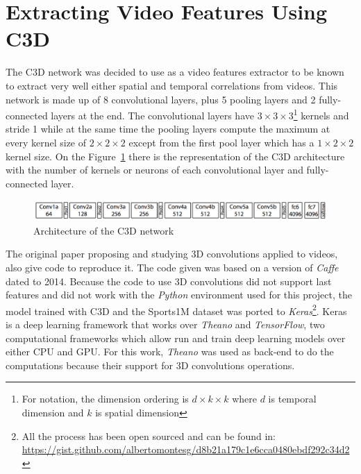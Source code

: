 \section{Extracting Video Features Using C3D}

The C3D network\cite{tran2014learning} was decided to use as a video features extractor to be known to extract very well\cite{baccouche2011sequential}\cite{tran2015deep}\cite{tran2014learning}\cite{shoutemporal} either spatial and temporal correlations from videos. This network is made up of 8 convolutional layers, plus 5 pooling layers and 2 fully-connected layers at the end. The convolutional layers have $3 \times 3 \times 3$\footnote{For notation, the dimension ordering is $d \times k \times k$ where $d$ is temporal dimension and $k$ is spatial dimension} kernels and stride 1 while at the same time the pooling layers compute the maximum at every kernel size of $2 \times 2 \times 2$ except from the first pool layer which has a $1 \times 2 \times 2$ kernel size. On the Figure~\ref{fig:c3d_architecture} there is the representation of the C3D architecture with the number of kernels or neurons of each convolutional layer and fully-connected layer.

\begin{figure}[H]
\begin{center}
\includegraphics[width=1\linewidth]{img/methodology/c3d_architecture}
\end{center}
\caption{Architecture of the C3D network}
\label{fig:c3d_architecture}
\end{figure}

The original paper proposing and studying 3D convolutions applied to videos, also give code to reproduce it. The code given was based on a version of \textit{Caffe}\cite{jia2014caffe} dated to 2014. Because the code to use 3D convolutions did not support last features and did not work with the \textit{Python} environment used for this project, the model trained with C3D and the Sports1M dataset was ported to \textit{Keras}\footnote{All the process has been open sourced and can be found in: \url{https://gist.github.com/albertomontesg/d8b21a179c1e6cca0480ebdf292c34d2}}. Keras is a deep learning framework that works over \textit{Theano}\cite{theano2016theano} and \textit{TensorFlow}\cite{abadi2016tensorflow}, two computational frameworks which allow run and train deep learning models over either CPU and GPU. For this work, \textit{Theano} was used as back-end to do the computations because their support for 3D convolutions operations.

